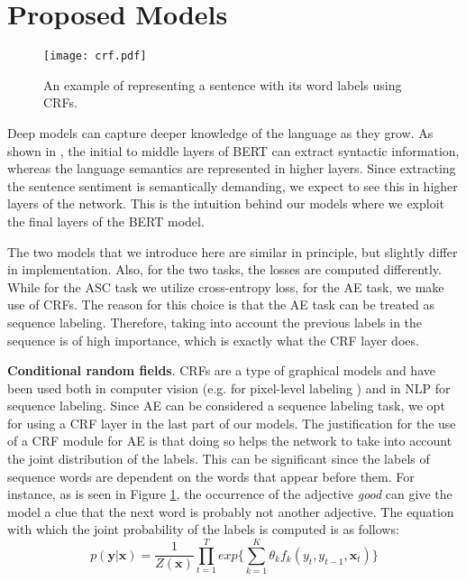 \documentclass{article}
\begin{document}
\section{Proposed Models}
\begin{figure}
	\centering
	\texttt{[image: crf.pdf]}
	\caption{An example of representing a sentence with its word labels using CRFs.}
	\label{crf}
\end{figure}

Deep models can capture deeper knowledge of the language as they grow. As shown in \cite{jawahar2019does}, the initial to middle layers of BERT can extract syntactic information, whereas the language semantics are represented in higher layers. Since extracting the sentence sentiment is semantically demanding, we expect to see this in higher layers of the network. This is the intuition behind our models where we exploit the final layers of the BERT model. 

The two models that we introduce here are similar in principle, but slightly differ in implementation. Also, for the two tasks, the losses are computed differently. While for the ASC task we utilize cross-entropy loss, for the AE task, we make use of CRFs. The reason for this choice is that the AE task can be treated as sequence labeling. Therefore, taking into account the previous labels in the sequence is of high importance, which is exactly what the CRF layer does. 	

\textbf{Conditional random fields}. CRFs \cite{lafferty2001conditional} are a type of graphical models and have been used both in computer vision (e.g. for pixel-level labeling \cite{zheng2015conditional}) and in NLP for sequence labeling. Since AE can be considered a sequence labeling task, we opt for using a CRF layer in the last part of our models. The justification for the use of a CRF module for AE is that doing so helps the network to take into account the joint distribution of the labels. This can be significant since the labels of sequence words are dependent on the words that appear before them. For instance, as is seen in Figure \ref{crf}, the occurrence of the adjective \textit{good} can give the model a clue that the next word is probably not another adjective. The equation with which the joint probability of the labels is computed is as follows:
\begin{equation}
p(\textbf{y}|\textbf{x}) = \frac{1}{Z(\textbf{x})} \prod_{t=1}^{T} exp \bigg\{\sum_{k=1}^{K}\theta_k f_k(y_t, y_{t-1}, \textbf{x}_t)\bigg\}
\label{formula1}
\end{equation}
\end{document}
